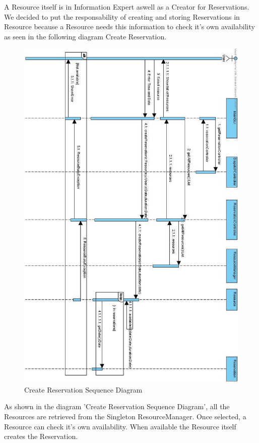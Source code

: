 \documentclass[a4paper,11pt]{article}
\begin{document}
			A Resource itself is in Information Expert aswell as a Creator for Reservations. We decided to put the responsability of creating and storing Reservations in Resource because a Resource needs this information to check it's own availability as seen in the following diagram Create Reservation.
			\begin{figure}[h!]
				\begin{center}
					\includegraphics[scale=0.5]{images/create_reservation.jpg}
				\end{center}
				\caption{Create Reservation Sequence Diagram}
			\end{figure}

			As shown in the diagram 'Create Reservation Sequence Diagram', all the Resources are retrieved from the Singleton ResourceManager. Once selected, a Resource can check it's own availability. When available the Resource itself creates the Reservation.
\end{document}
